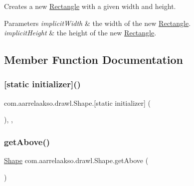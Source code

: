 Creates a new \hyperlink{classcom_1_1aarrelaakso_1_1drawl_1_1_rectangle}{Rectangle} with a given width and height. 


\begin{DoxyParams}{Parameters}
{\em implicit\+Width} & the width of the new \hyperlink{classcom_1_1aarrelaakso_1_1drawl_1_1_rectangle}{Rectangle}. \\
\hline
{\em implicit\+Height} & the height of the new \hyperlink{classcom_1_1aarrelaakso_1_1drawl_1_1_rectangle}{Rectangle}. \\
\hline
\end{DoxyParams}


\subsection{Member Function Documentation}
\mbox{\label{classcom_1_1aarrelaakso_1_1drawl_1_1_shape_ad2adcb85374cf5d6d59429628314e8d1}} 
\subsubsection{\texorpdfstring{[static initializer]()}{[static initializer]()}}
{\footnotesize\ttfamily com.\+aarrelaakso.\+drawl.\+Shape.\mbox{[}static initializer\mbox{]} (\begin{DoxyParamCaption}{ }\end{DoxyParamCaption})\hspace{0.3cm}{\ttfamily [static]}, {\ttfamily [package]}, {\ttfamily [inherited]}}

\mbox{\label{classcom_1_1aarrelaakso_1_1drawl_1_1_shape_acebea2aa57031322323c9bf50ee447db}} 
\subsubsection{\texorpdfstring{get\+Above()}{getAbove()}}
{\footnotesize\ttfamily \hyperlink{classcom_1_1aarrelaakso_1_1drawl_1_1_shape}{Shape} com.\+aarrelaakso.\+drawl.\+Shape.\+get\+Above (\begin{DoxyParamCaption}{ }\end{DoxyParamCaption})\hspace{0.3cm}{\ttfamily [inherited]}}



